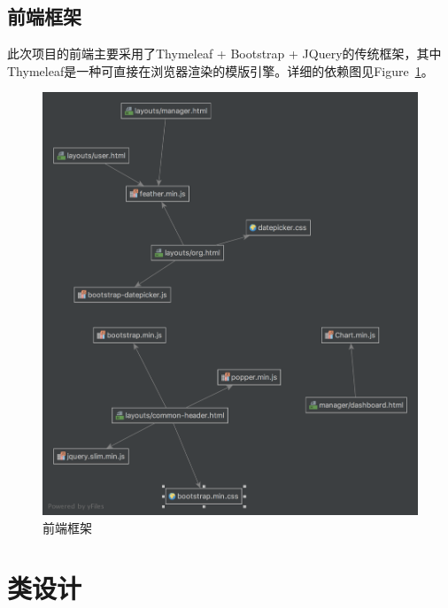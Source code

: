 \documentclass[11pt]{article}
\begin{document}
\subsection{前端框架}
此次项目的前端主要采用了Thymeleaf + Bootstrap + JQuery的传统框架，其中Thymeleaf是一种可直接在浏览器渲染的模版引擎。详细的依赖图见Figure~\ref{fig:frontend-dependency}。

\begin{figure}[h]
  	\includegraphics[width=\linewidth]{img/Front-End-Framework.png}
  	\caption{前端框架}
  	\label{fig:frontend-dependency}
\end{figure}

\section{类设计}
\end{document}
